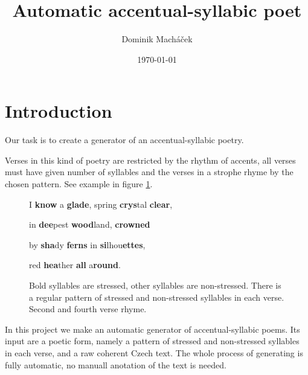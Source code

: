 \documentclass[a4]{article}
\begin{document}
\title{Automatic accentual-syllabic poet}

\author{Dominik Macháček}

\date{\today}

\maketitle



\section{Introduction}

Our task is to create a generator of an accentual-syllabic poetry.

Verses in this kind of poetry are restricted by the rhythm of accents, all
verses must have given number of syllables and the verses in a strophe
rhyme by the chosen pattern. See example in figure \ref{may}.

\def\surl#1{%
    {\footnotesize\url{#1}}%
}%

\begin{figure}[ht]
\label{may}
\centerline{
I {\bf know} a {\bf glade}, spring {\bf crys}tal {\bf clear},
}
\centerline{
in {\bf dee}pest {\bf wood}land, {\bf crowned}
}
\centerline{
by {\bf sha}dy {\bf ferns} in {\bf si}lhou{\bf ettes},
}
\centerline{
red {\bf hea}ther {\bf all} a{\bf round}.\footnotemark
}
\caption{Bold syllables are stressed, other syllables are non-stressed.
There is a regular pattern of stressed and non-stressed
syllables in each verse. Second and fourth verse rhyme.
}
\end{figure}






In this project we make an automatic generator of accentual-syllabic
poems. Its input are a poetic form, namely a pattern of stressed and
non-stressed syllables in each verse, and a raw coherent Czech text. The
whole process of generating is fully automatic, no manuall anotation of
the text is needed.
\end{document}
